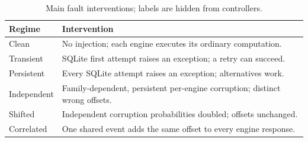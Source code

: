 \begin{table}[!htbp]
\caption{Main fault interventions; labels are hidden from controllers.}
\label{tab:regimes}
\centering\small
\begin{tabular}{p{}p{}}
\toprule
Regime & Intervention \\
\midrule
Clean & No injection; each engine executes its ordinary computation. \\
Transient & SQLite first attempt raises an exception; a retry can succeed. \\
Persistent & Every SQLite attempt raises an exception; alternatives work. \\
Independent & Family-dependent, persistent per-engine corruption; distinct wrong offsets. \\
Shifted & Independent corruption probabilities doubled; offsets unchanged. \\
Correlated & One shared event adds the same offset to every engine response. \\
\bottomrule
\end{tabular}
\end{table}
